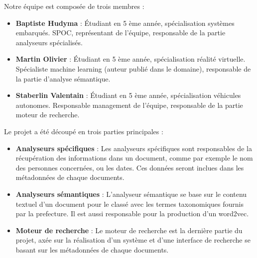 Notre équipe est composée de trois membres :
\begin {itemize}
\item \textbf {Baptiste Hudyma} :
Étudiant en 5 ème année, spécialisation systèmes embarqués.
SPOC, représentant de l'équipe, responsable de la partie analyseurs spécialisés. 

\item \textbf {Martin Olivier} : 
Étudiant en 5 ème année, spécialisation réalité virtuelle.
Spécialiste machine learning (auteur publié dans le domaine), responsable de la partie d'analyse sémantique.


\item \textbf {Staberlin Valentain} :
Étudiant en 5 ème année, spécialisation véhicules autonomes.
Responsable management de l'équipe, responsable de la partie moteur de recherche.
\\
\end {itemize}


Le projet a été découpé en trois parties principales :
\begin {itemize}
\item \textbf {Analyseurs spécifiques} : 
Les analyseurs spécifiques sont responsables de la récupération des informations dans un document, comme par exemple le nom des personnes concernées, ou les dates.
Ces données seront inclues dans les métadonnées de chaque documents.
\\
\item \textbf {Analyseurs sémantiques} :
L'analyseur sémantique se base sur le contenu textuel d'un document pour le classé avec les termes taxonomiques fournis par la prefecture.
Il est aussi responsable pour la production d'un word2vec.
\\
\item \textbf {Moteur de recherche} :
Le moteur de recherche est la dernière partie du projet, axée sur la réalisation d'un système et d'une interface de recherche se basant sur les métadonnées de chaque documents.
\\
\end {itemize}
